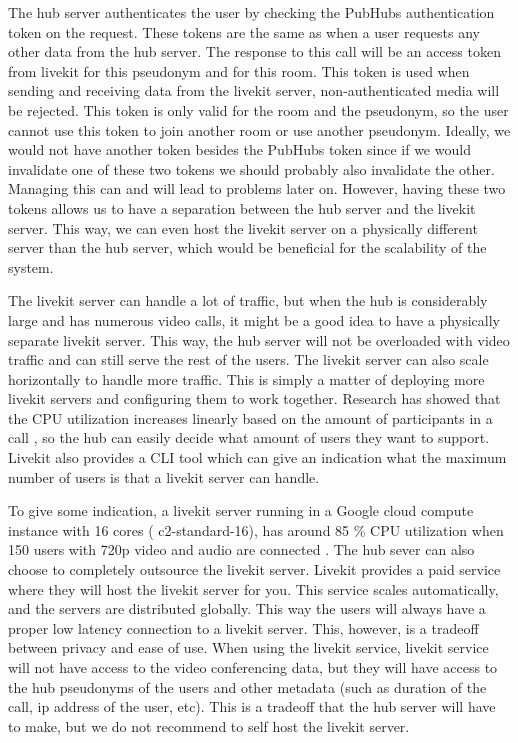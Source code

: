 \documentclass{report}
\begin{document}
The hub server authenticates the user by checking the PubHubs authentication token on the request. These tokens are
the same as when a user requests any other data from the hub server. The response to this call will be an
access token from livekit for this pseudonym and for this room. This token is used when sending and receiving data
from the livekit server, non-authenticated media will be rejected. This token is only valid for the room and the
pseudonym, so the user cannot use this token to join another room or use another pseudonym. Ideally, we would not
have another token besides the PubHubs token since if we would invalidate one of these two tokens we should probably
also invalidate the other. Managing this can and will lead to problems later on. However, having these two tokens
allows us to have a separation between the hub server and the livekit server. This way, we can even host the livekit
server on a physically different server than the hub server, which would be beneficial for the scalability of the
system.

The livekit server can handle a lot of traffic, but when the hub is considerably large and has numerous video calls, it
might be a good idea to have a physically separate livekit server. This way, the hub server will not be overloaded with
video traffic and can still serve the rest of the users. The livekit server can also scale horizontally to handle
more traffic. This is simply a matter of deploying more livekit servers and configuring them to work together.
Research has showed that the CPU utilization increases linearly based on the amount of participants in a call
\cite{muscariello_securing_2023}, so the hub can easily decide what amount of users they want to
support. Livekit also provides a CLI tool which can give an indication what the maximum number of users is that a
livekit server can handle.


To give some indication, a livekit server running in a Google cloud compute instance with 16 cores (
c2-standard-16), has around 85 \% CPU utilization when 150 users with 720p video and audio are connected
\cite{noauthor_benchmarking_nodate}. The hub sever can also choose to completely outsource the livekit server.
Livekit provides a paid service where they will host the livekit server for you. This service scales
automatically, and the servers are distributed globally. This way the users will always have a proper low
latency connection to a livekit server. This, however, is a tradeoff between privacy and ease of use. When using
the livekit service, livekit service will not have access to the video conferencing data, but they will have access to
the hub pseudonyms of the users and other metadata (such as duration of the call, ip address of the user, etc). This
is a tradeoff that the hub server will have to make, but we do not recommend to self host the livekit server.
\end{document}
